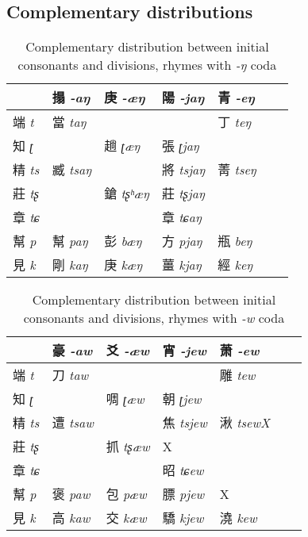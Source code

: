 \documentclass[oneside,a4paper,11pt]{article}
\newcommand{\ipa}[1]{{\phon\textit{#1}}}
\newcommand{\grise}[1]{\cellcolor{lightgray}\textbf{#1}}
\newcommand{\zh}[1]{{\cn #1}}
\newcommand{\zhc}[2]{\zh{#1} \ipa{#2}}
\begin{document}
\subsection{Complementary distributions}

 \begin{table}[H]
 \caption{Complementary distribution between initial consonants and divisions, rhymes with \ipa{-ŋ} coda} \centering
\begin{tabular}{l|llllll}
\toprule
&\zhc{搨}{-aŋ}& \zhc{庚}{-æŋ} & \zhc{陽}{-jaŋ} &\zhc{青}{-eŋ} \\
\midrule
\zhc{端}{t} 	&	\zhc{當}{taŋ} 	& \grise{}	& \grise{}	&	\zhc{丁}{teŋ}  \\
\zhc{知}{ʈ} 	&	\grise{}&\zhc{趟}{ʈæŋ} 	&	\zhc{張}{ʈjaŋ} 	&	\grise{}	&		\\
\zhc{精}{ts} 	&	\zhc{臧}{tsaŋ} &\grise{}	&	\zhc{將}{tsjaŋ} 	&	\zhc{菁}{tseŋ} 	&		\\
\zhc{莊}{tʂ} 	&	\grise{}&\zhc{鎗}{tʂʰæŋ} 	& \zhc{莊}{tʂjaŋ} 	&		\grise{}&		\\
\zhc{章}{tɕ} 	&		\grise{}&		\grise{}&	\zhc{章}{tɕaŋ} 	&		\grise{} 		\\
\zhc{幫}{p} 	&	\zhc{幫}{paŋ} 	&	\zhc{彭}{bæŋ} 	&	\zhc{方}{pjaŋ} 	&	\zhc{瓶}{beŋ}\\
\zhc{見}{k} 	&	\zhc{剛}{kaŋ} 	&	\zhc{庚}{kæŋ} 	&	\zhc{薑}{kjaŋ} 	&	\zhc{經}{keŋ} 	\\
\bottomrule
\end{tabular}
\end{table}


 \begin{table}[H]
 \caption{Complementary distribution between initial consonants and divisions, rhymes with \ipa{-w} coda} \centering
\begin{tabular}{l|llllll}
\toprule
&\zhc{豪}{-aw}& \zhc{爻}{-æw} & \zhc{宵}{-jew} &\zhc{萧}{-ew} \\
\midrule
\zhc{端}{t} 	&	\zhc{刀}{taw} 	& \grise{}	& \grise{}	&	\zhc{雕}{tew}  \\
\zhc{知}{ʈ} 	&	\grise{}&\zhc{啁}{ʈæw} 	&	\zhc{朝}{ʈjew} 	&	\grise{}	&		\\
\zhc{精}{ts} 	&	\zhc{遭}{tsaw} &\grise{}	&	\zhc{焦}{tsjew} 	&	\zhc{湫}{tsewX} 	&		\\
\zhc{莊}{tʂ} 	&	\grise{}&\zhc{抓}{tʂæw} 	& X	&		\grise{}&		\\
\zhc{章}{tɕ} 	&		\grise{}&		\grise{}&	\zhc{昭}{tɕew} 	&		\grise{} 		\\
\zhc{幫}{p} 	&	\zhc{褒}{paw} 	&	\zhc{包}{pæw} 	&	\zhc{膘}{pjew} 	&	X	\\
\zhc{見}{k} 	&	\zhc{高}{kaw} 	&	\zhc{交}{kæw} 	&	\zhc{驕}{kjew} 	&	\zhc{澆}{kew} 	\\
\bottomrule
\end{tabular}
\end{table}
\end{document}
